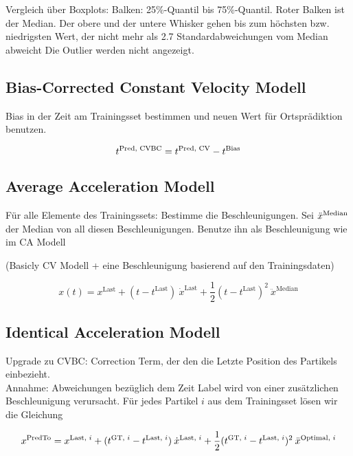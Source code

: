 Vergleich über Boxplots: Balken: 25\%-Quantil bis 75\%-Quantil.
Roter Balken ist der Median. Der obere und der untere Whisker 
gehen bis zum höchsten bzw. niedrigsten Wert, der nicht mehr als 2.7 Standardabweichungen vom Median abweicht
Die Outlier werden nicht angezeigt.


\subsection{Bias-Corrected Constant Velocity Modell}

Bias in der Zeit am Trainingsset bestimmen und neuen Wert für Ortsprädiktion benutzen.

\begin{equation*}
    t{^{\text{Pred, CVBC}}} = t{^{\text{Pred, CV}}} - t{^{\text{Bias}}}
\end{equation*}

\subsection{Average Acceleration Modell}

Für alle Elemente des Trainingssets: Bestimme die Beschleunigungen.
Sei \(\ddot{x}{^{\text{Median}}}\) der Median von all diesen Beschleunigungen.
Benutze ihn als Beschleunigung wie im CA Modell

(Basicly CV Modell + eine Beschleunigung basierend auf den Trainingsdaten)

\begin{equation*}
    x(t) = x^{\text{Last}} + (t - t^{\text{Last}}) \: \dot{x}^{\text{Last}} 
    + \frac{1}{2} (t - t^{\text{Last}})^2 \: \ddot{x}^{\text{Median}}
\end{equation*}

\subsection{Identical Acceleration Modell}
 
Upgrade zu CVBC: Correction Term, der den die Letzte Position des Partikels einbezieht.\\
Annahme: Abweichungen bezüglich dem Zeit Label wird von einer zusätzlichen Beschleunigung verursacht.
Für jedes Partikel \( i\) aus dem Trainingsset lösen wir die Gleichung 

\begin{equation*}
    x{^{\text{PredTo}}} = x{^{\text{Last, \(i\)}}} + (t{^{\text{GT, \(i\)}}} - t{^{\text{Last, \(i\)}}}) \: \dot{x}{^{\text{Last, \(i\)}}}
    + \frac{1}{2}(t{^{\text{GT, \(i\)}}} - t{^{\text{Last, \(i\)}}})^2 \: \ddot{x}{^{\text{Optimal, \(i\)}}}
\end{equation*}

